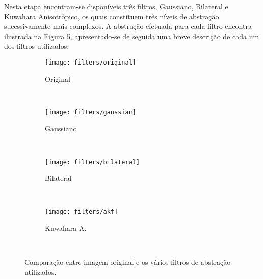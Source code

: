 Nesta etapa encontram-se disponíveis três filtros, Gaussiano, Bilateral e Kuwahara Anisotrópico, os quais constituem três níveis de abstração sucessivamente mais complexos. A abstração efetuada para cada filtro encontra  ilustrada na Figura \ref{fig:filters}, apresentado-se de seguida uma breve descrição de cada um dos filtros utilizados:

\begin{figure}[t]
        \centering
        \begin{subfigure}[b]{0.2\textwidth}
                \centering
                \texttt{[image: filters/original]}
                \caption{Original}
                \label{fig:filters-original}
        \end{subfigure}%
        ~
        \begin{subfigure}[b]{0.2\textwidth}
                \centering
                \texttt{[image: filters/gaussian]}
                \caption{Gaussiano}
                \label{fig:filters-gaussian}
        \end{subfigure}
        ~ 
        \begin{subfigure}[b]{0.2\textwidth}
                \centering
                \texttt{[image: filters/bilateral]}
                \caption{Bilateral}
                \label{fig:filters-bilateral}
        \end{subfigure}
        ~
        \begin{subfigure}[b]{0.2\textwidth}
                \centering
                \texttt{[image: filters/akf]}
                \caption{Kuwahara A.}
                \label{fig:filters-kuwahara}
        \end{subfigure}
        ~ 
        \caption{Comparação entre imagem original e os vários filtros de abstração utilizados.}\label{fig:filters}
\end{figure}

